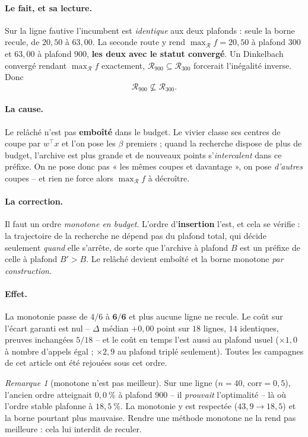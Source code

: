 \documentclass[11pt,a4paper]{article}
\theoremstyle{plain}
\theoremstyle{remark}
\newtheorem{remark}{Remarque}
\newcommand{\Rcal}{\mathcal{R}}
\begin{document}
\paragraph{Le fait, et sa lecture.} Sur la ligne fautive l'incumbent est
\emph{identique} aux deux plafonds : seule la borne recule, de $20{,}50$ à
$63{,}00$. La seconde route y rend $\max_{\Rcal}f=20{,}50$ à plafond $300$
et $63{,}00$ à plafond $900$, \textbf{les deux avec le statut convergé}. Un
Dinkelbach convergé rendant $\max_{\Rcal}f$ exactement,
$\Rcal_{900}\subseteq\Rcal_{300}$ forcerait l'inégalité inverse. Donc
\[
  \Rcal_{900}\not\subseteq\Rcal_{300} .
\]

\paragraph{La cause.} Le relâché n'est pas \textbf{emboîté} dans le budget.
Le vivier classe ses centres de coupe par $w^{\top}x$ et l'on pose les
$\beta$ premiers ; quand la recherche dispose de plus de budget, l'archive
est plus grande et de nouveaux points s'\emph{intercalent} dans ce préfixe.
On ne pose donc pas « les mêmes coupes et davantage », on pose
\emph{d'autres} coupes -- et rien ne force alors $\max_{\Rcal}f$ à décroître.

\paragraph{La correction.} Il faut un ordre \emph{monotone en budget}.
L'ordre d'\textbf{insertion} l'est, et cela se vérifie : la trajectoire de
la recherche ne dépend pas du plafond total, qui décide seulement
\emph{quand} elle s'arrête, de sorte que l'archive à plafond $B$ est un
préfixe de celle à plafond $B'>B$. Le relâché devient emboîté et la borne
monotone \emph{par construction}.

\paragraph{Effet.} La monotonie passe de $4/6$ à $\mathbf{6/6}$ et plus
aucune ligne ne recule. Le coût sur l'écart garanti est nul -- $\Delta$
médian $+0{,}00$ point sur $18$ lignes, $14$ identiques, preuves inchangées
$5/18$ -- et le coût en temps l'est aussi au plafond usuel ($\times 1{,}0$ à
nombre d'appels égal ; $\times 2{,}9$ au plafond triplé seulement). Toutes
les campagnes de cet article ont été rejouées sous cet ordre.

\begin{remark}[monotone n'est pas meilleur]
Sur une ligne ($n=40$, $\text{corr}=0{,}5$), l'ancien ordre atteignait
$0{,}0\ \%$ à plafond $900$ -- il \emph{prouvait} l'optimalité -- là où
l'ordre stable plafonne à $18{,}5\ \%$. La monotonie y est respectée
($43{,}9\to 18{,}5$) et la borne pourtant plus mauvaise. Rendre une méthode
monotone ne la rend pas meilleure : cela lui interdit de reculer.
\end{remark}
\end{document}
